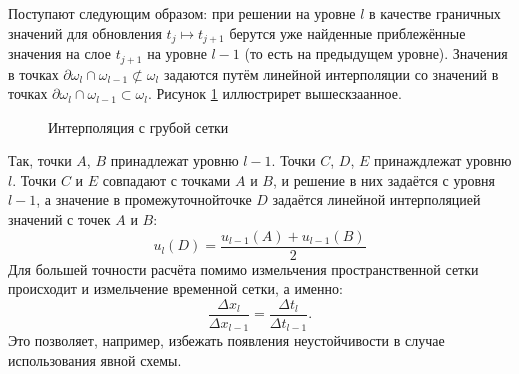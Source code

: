 Поступают следующим образом: при решении на уровне $l$ в качестве граничных значений для обновления $t_j \mapsto t_{j + 1}$ берутся уже найденные приблежённые значения на слое $t_{j + 1}$ на уровне $l - 1$ (то есть на предыдущем уровне).
Значения в точках $\partial \omega_l \cap \omega_{l - 1} \not\subset \omega_{l}$ задаются путём линейной интерполяции со значений в точках $\partial \omega_l \cap \omega_{l - 1} \subset \omega_{l}$.
Рисунок \ref{fig:linear_interpolation} иллюстрирет вышескзаанное.
\begin{figure}[h]
    \centering
    \caption{Интерполяция с грубой сетки}
    \label{fig:linear_interpolation}
\end{figure}
Так, точки $A$, $B$ принадлежат уровню $l - 1$.
Точки $C$, $D$, $E$ принаждлежат уровню $l$.
Точки $C$ и $E$ совпадают с точками $A$ и $B$, и решение в них задаётся с уровня $l - 1$, а значение в \glqq промежуточной\grqq точке $D$ задаётся линейной интерполяцией значений с точек $A$ и $B$:
\begin{equation*}
    u_l(D) = \frac{u_{l - 1}(A) + u_{l - 1}(B)}{2}
\end{equation*}
Для большей точности расчёта помимо измельчения пространственной сетки происходит и измельчение временной сетки, а именно:
\begin{equation*}
    \frac{\Delta x_{l}}{\Delta x_{l - 1}} = \frac{\Delta t_{l}}{\Delta t_{l - 1}}.
\end{equation*}
Это позволяет, например, избежать появления неустойчивости в случае использования явной схемы.